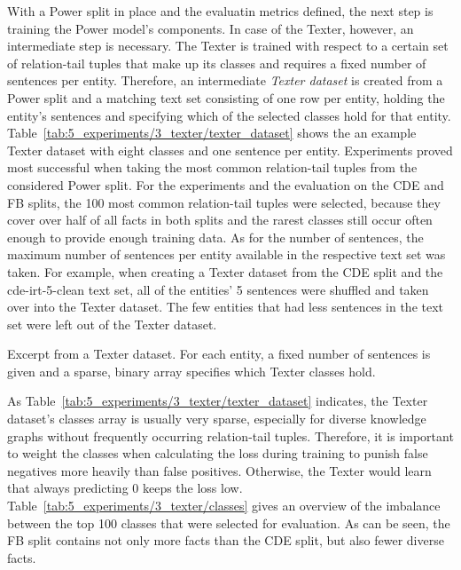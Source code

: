 With a Power split in place and the evaluatin metrics defined, the next step is training the Power model's components. In case of the Texter, however, an intermediate step is necessary. The Texter is trained with respect to a certain set of relation-tail tuples that make up its classes and requires a fixed number of sentences per entity. Therefore, an intermediate \emph{Texter dataset} is created from a Power split and a matching text set consisting of one row per entity, holding the entity's sentences and specifying which of the selected classes hold for that entity. Table~\ref{tab:5_experiments/3_texter/texter_dataset} shows the an example Texter dataset with eight classes and one sentence per entity. Experiments proved most successful when taking the most common relation-tail tuples from the considered Power split. For the experiments and the evaluation on the CDE and FB splits, the 100 most common relation-tail tuples were selected, because they cover over half of all facts in both splits and the rarest classes still occur often enough to provide enough training data. As for the number of sentences, the maximum number of sentences per entity available in the respective text set was taken. For example, when creating a Texter dataset from the CDE split and the cde-irt-5-clean text set, all of the entities' 5 sentences were shuffled and taken over into the Texter dataset. The few entities that had less sentences in the text set were left out of the Texter dataset.

\begin{table}
    \centering
    
    \caption{Excerpt from a Texter dataset. For each entity, a fixed number of sentences is given and a sparse, binary array specifies which Texter classes hold.}
    \label{tab:5_experiments/3_texter/texter_dataset}
\end{table}

As Table~\ref{tab:5_experiments/3_texter/texter_dataset} indicates, the Texter dataset's classes array is usually very sparse, especially for diverse knowledge graphs without frequently occurring relation-tail tuples. Therefore, it is important to weight the classes when calculating the loss during training to punish false negatives more heavily than false positives. Otherwise, the Texter would learn that always predicting 0 keeps the loss low. Table~\ref{tab:5_experiments/3_texter/classes} gives an overview of the imbalance between the top 100 classes that were selected for evaluation. As can be seen, the FB split contains not only more facts than the CDE split, but also fewer diverse facts.

